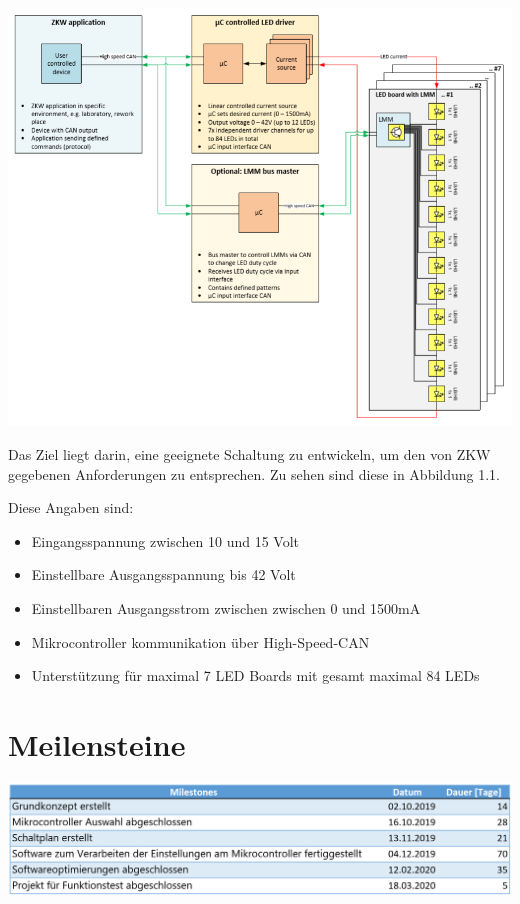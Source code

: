 \documentclass[paper=a4, 12pt]{scrreprt}
\begin{document}
	\begin{adjustbox}{center,caption={Blockschaltbild von ZKW},label={ZKW-Blockschaltbild},nofloat=figure,vspace=\bigskipamount}
	\includegraphics[width=15cm]{img/ZKW_Blockschaltbild.PNG}
	\end{adjustbox}

	Das Ziel liegt darin, eine geeignete Schaltung zu entwickeln, um den von ZKW gegebenen Anforderungen zu entsprechen. Zu sehen sind diese in Abbildung 1.1.
	
	Diese Angaben sind:
	\begin{itemize}
		\item{Eingangsspannung zwischen 10 und 15 Volt}
		\item{Einstellbare Ausgangsspannung bis 42 Volt}
		\item{Einstellbaren Ausgangsstrom zwischen zwischen 0 und 1500mA}
		\item{Mikrocontroller kommunikation über High-Speed-CAN}
		\item{Unterstützung für maximal 7 LED Boards mit gesamt maximal 84 LEDs}
	\end{itemize}
	
	\section{Meilensteine}
	\begin{adjustbox}{center,nofloat=figure,vspace=\bigskipamount}
	\includegraphics[width=\textwidth]{img/meilensteine.PNG}
	\end{adjustbox}
	
\end{document}
